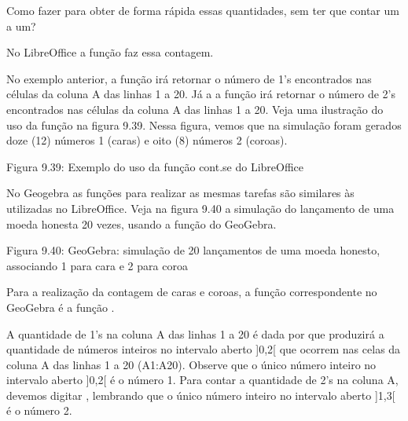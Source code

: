 Como fazer para obter de forma rápida essas quantidades, sem ter que contar um a um?

No LibreOffice a função  faz essa contagem.

No exemplo anterior, a função  irá retornar o número de 1’s encontrados nas células da coluna A das linhas 1 a 20. Já a  a função  irá retornar o número de 2’s encontrados nas células da coluna A das linhas 1 a 20. Veja uma ilustração do uso da função na figura 9.39. Nessa figura, vemos que na simulação foram gerados doze (12) números 1 (caras) e oito (8) números 2 (coroas).
\label{\detokenize{PE511-A:id1}}
\begin{figure}[H]
\centering

\noindent{}
\label{\detokenize{PE511-A:id1}}\end{figure}

Figura 9.39: Exemplo do uso da função cont.se do LibreOffice

No Geogebra as funções para realizar as mesmas tarefas são similares às utilizadas no LibreOffice. Veja na figura 9.40 a simulação do lançamento de uma moeda honesta 20 vezes, usando a função  do GeoGebra.
\label{\detokenize{PE511-A:id2}}
\begin{figure}[H]
\centering

\noindent{}
\label{\detokenize{PE511-A:id2}}\end{figure}

Figura 9.40: GeoGebra: simulação de 20 lançamentos de uma moeda honesto, associando 1 para cara e 2 para coroa

Para a realização da contagem de caras e coroas, a função correspondente no GeoGebra é a função .

A quantidade de 1’s na coluna A das linhas 1 a 20 é dada por  que produzirá a quantidade de números inteiros no intervalo aberto {]}0,2{[} que ocorrem nas celas da coluna A das linhas 1 a 20 (A1:A20). Observe que o único número inteiro no intervalo aberto {]}0,2{[} é o número 1. Para contar a quantidade de 2’s na coluna A, devemos digitar , lembrando que o único número inteiro no intervalo aberto {]}1,3{[} é o número 2.
\label{\detokenize{PE511-A:id3}}
\begin{figure}[H]
\centering

\noindent{}
\label{\detokenize{PE511-A:id3}}\end{figure}

